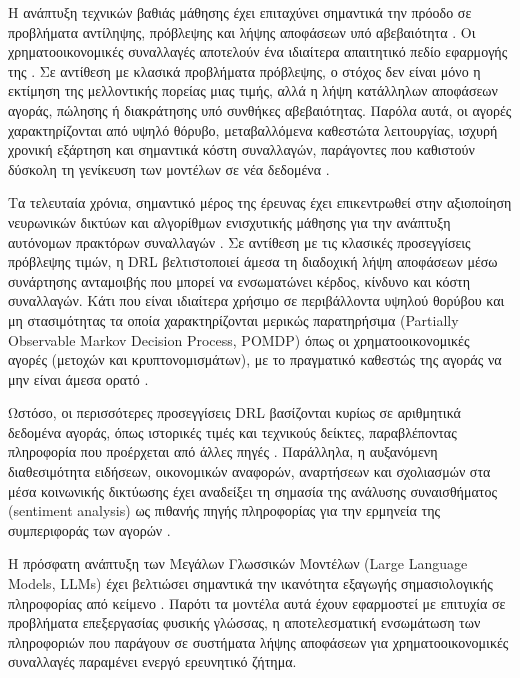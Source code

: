 Η ανάπτυξη τεχνικών βαθιάς μάθησης έχει επιταχύνει σημαντικά την πρόοδο 
σε προβλήματα αντίληψης, πρόβλεψης και λήψης αποφάσεων υπό αβεβαιότητα 
\cite{goodfellow2016}. Οι χρηματοοικονομικές συναλλαγές αποτελούν ένα
ιδιαίτερα απαιτητικό πεδίο εφαρμογής της \cite{hambly2023rlfinance, lopezdeprado2018}. Σε αντίθεση 
με κλασικά προβλήματα πρόβλεψης, ο στόχος δεν είναι μόνο η εκτίμηση της 
μελλοντικής πορείας μιας τιμής, αλλά η λήψη κατάλληλων αποφάσεων αγοράς, 
πώλησης ή διακράτησης υπό συνθήκες αβεβαιότητας. Παρόλα αυτά, οι αγορές 
χαρακτηρίζονται από υψηλό θόρυβο, μεταβαλλόμενα καθεστώτα λειτουργίας, 
ισχυρή χρονική εξάρτηση και σημαντικά κόστη συναλλαγών, παράγοντες που 
καθιστούν δύσκολη τη γενίκευση των μοντέλων σε νέα δεδομένα \cite{lopezdeprado2018, hambly2023rlfinance}.

Τα τελευταία χρόνια, σημαντικό μέρος της έρευνας έχει επικεντρωθεί στην 
αξιοποίηση νευρωνικών δικτύων και αλγορίθμων ενισχυτικής μάθησης για την 
ανάπτυξη αυτόνομων πρακτόρων συναλλαγών \cite{moody2001rltrading}. 
Σε αντίθεση με τις κλασικές προσεγγίσεις πρόβλεψης τιμών, η DRL 
βελτιστοποιεί άμεσα τη διαδοχική λήψη αποφάσεων μέσω συνάρτησης 
ανταμοιβής που μπορεί να ενσωματώνει κέρδος, κίνδυνο και κόστη συναλλαγών. 
Κάτι που είναι ιδιαίτερα χρήσιμο σε περιβάλλοντα υψηλού θορύβου και 
μη στασιμότητας τα οποία χαρακτηρίζονται μερικώς παρατηρήσιμα 
(Partially Observable Markov Decision Process, POMDP) όπως οι 
χρηματοοικονομικές αγορές (μετοχών και κρυπτονομισμάτων), με το πραγματικό
καθεστώς της αγοράς να μην είναι άμεσα ορατό \cite{kaelbling1998pomdp}.

Ωστόσο, οι περισσότερες προσεγγίσεις DRL βασίζονται κυρίως σε αριθμητικά 
δεδομένα αγοράς, όπως ιστορικές τιμές και τεχνικούς δείκτες, παραβλέποντας 
πληροφορία που προέρχεται από άλλες πηγές \cite{jiang2017cryptoportfolio}. 
Παράλληλα, η αυξανόμενη διαθεσιμότητα ειδήσεων, οικονομικών αναφορών, αναρτήσεων 
και σχολιασμών στα μέσα κοινωνικής δικτύωσης έχει αναδείξει τη σημασία της 
ανάλυσης συναισθήματος (sentiment analysis) ως πιθανής πηγής πληροφορίας για 
την ερμηνεία της συμπεριφοράς των αγορών \cite{bollen2011twitter}.

Η πρόσφατη ανάπτυξη των Μεγάλων Γλωσσικών Μοντέλων (Large Language Models, LLMs)
 έχει βελτιώσει σημαντικά την ικανότητα εξαγωγής σημασιολογικής πληροφορίας 
 από κείμενο \cite{brown2020gpt3}. Παρότι τα μοντέλα αυτά έχουν εφαρμοστεί 
 με επιτυχία σε προβλήματα επεξεργασίας φυσικής γλώσσας, η αποτελεσματική 
 ενσωμάτωση των πληροφοριών που παράγουν σε συστήματα λήψης αποφάσεων για 
 χρηματοοικονομικές συναλλαγές παραμένει ενεργό ερευνητικό ζήτημα.

